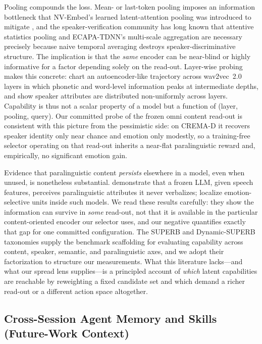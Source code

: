 Pooling compounds the loss. Mean- or last-token pooling imposes an information bottleneck that NV-Embed's learned latent-attention pooling was introduced to mitigate \citep{nvembed2024}, and the speaker-verification community has long known that attentive statistics pooling \citep{attnstatspool2018} and ECAPA-TDNN's multi-scale aggregation \citep{ecapatdnn2020} are necessary precisely because naive temporal averaging destroys speaker-discriminative structure. The implication is that the \emph{same} encoder can be near-blind or highly informative for a factor depending solely on the read-out. Layer-wise probing makes this concrete: \citet{pasad2021layerwise} chart an autoencoder-like trajectory across wav2vec~2.0 layers in which phonetic and word-level information peaks at intermediate depths, and \citet{spkattrprobing2025} show speaker attributes are distributed non-uniformly across layers. Capability is thus not a scalar property of a model but a function of (layer, pooling, query). Our committed probe of the frozen omni content read-out is consistent with this picture from the pessimistic side: on CREMA-D it recovers speaker identity only near chance and emotion only modestly, so a training-free selector operating on that read-out inherits a near-flat paralinguistic reward and, empirically, no significant emotion gain.

Evidence that paralinguistic content \emph{persists} elsewhere in a model, even when unused, is nonetheless substantial. \citet{frozenllmparaling2024} demonstrate that a frozen LLM, given speech features, perceives paralinguistic attributes it never verbalizes; \citet{emotionneurons2026} localize emotion-selective units inside such models. We read these results carefully: they show the information can survive in \emph{some} read-out, not that it is available in the particular content-oriented encoder our selector uses, and our negative quantifies exactly that gap for one committed configuration. The SUPERB and Dynamic-SUPERB taxonomies \citep{superb2021,dynsuperb2023} supply the benchmark scaffolding for evaluating capability across content, speaker, semantic, and paralinguistic axes, and we adopt their factorization to structure our measurements. What this literature lacks---and what our spread lens supplies---is a principled account of \emph{which} latent capabilities are reachable by reweighting a fixed candidate set and which demand a richer read-out or a different action space altogether.

\subsection{Cross-Session Agent Memory and Skills (Future-Work Context)}
\label{sec:rw-memory}

